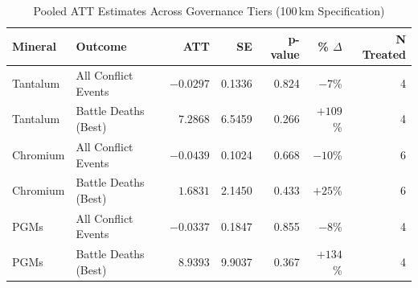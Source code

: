 \begin{longtable}{llrrrrr}
\caption{Pooled ATT Estimates Across Governance Tiers (100\,km Specification)} \label{tab:pooled_effects} \\
\toprule
\textbf{Mineral} & \textbf{Outcome} & \textbf{ATT} & \textbf{SE} & \textbf{p-value} & \textbf{\% $\Delta$} & \textbf{N Treated} \\
\midrule
\endfirsthead
\bottomrule
\endlastfoot
Tantalum & All Conflict Events & $-0.0297$ & 0.1336 & 0.824 & $-7$\% & 4 \\
Tantalum & Battle Deaths (Best) & $7.2868$ & 6.5459 & 0.266 & $+109$\% & 4 \\
\midrule
Chromium & All Conflict Events & $-0.0439$ & 0.1024 & 0.668 & $-10$\% & 6 \\
Chromium & Battle Deaths (Best) & $1.6831$ & 2.1450 & 0.433 & $+25$\% & 6 \\
\midrule
PGMs & All Conflict Events & $-0.0337$ & 0.1847 & 0.855 & $-8$\% & 4 \\
PGMs & Battle Deaths (Best) & $8.9393$ & 9.9037 & 0.367 & $+134$\% & 4 \\
\end{longtable}
